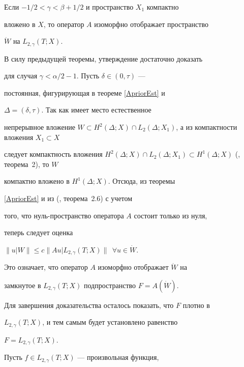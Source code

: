 \begin{thms}\label{GlobSolvComp}


Если $-1/2 < \gamma < \beta+1/2$ и пространство $X_1$ компактно


вложено в $X$, то оператор $A$ изоморфно отображает пространство


$\dot{W}$ на $L_{2,\gamma}(T;X)$.


\end{thms}








\begin{pf}


В силу предыдущей теоремы, утверждение достаточно доказать


для случая $\gamma < \alpha/2-1$. Пусть $\delta \in (0, \tau)$ ---


постоянная, фигурирующая в теореме \ref{ApriorEst} и


$\Delta=(\delta,\tau)$. Так как имеет место естественное


непрерывное вложение $W \subset H^2(\Delta;X) \cap


L_2(\Delta;X_1)$, а из компактности вложения $X_1 \subset X$


следует компактность вложения $H^2(\Delta;X) \cap L_2(\Delta;X_1)


\subset H^1(\Delta;X)$ (\cite{Shahmurov}, теорема~2), то $W$


компактно вложено в $H^1(\Delta;X)$. Отсюда, из теоремы


\ref{ApriorEst} и из (\cite{IzVuz03-3}, теорема~2.6) с учетом


того, что нуль-пространство оператора $A$ состоит только из нуля,


теперь следует оценка


$\|u|W\| \le c \|Au|L_{2,\gamma}(T;X)\| \ \ \forall u \in \Dot{W}$.


Это означает, что оператор $A$ изоморфно отображает $\Dot{W}$ на


замкнутое в $L_{2,\gamma}(T;X)$ подпространство $F=A(\Dot{W})$.


Для завершения доказательства осталось показать, что $F$ плотно в


$L_{2,\gamma}(T;X)$, и тем самым будет установлено равенство


$F=L_{2,\gamma}(T;X)$.





Пусть $f \in L_{2,\gamma}(T;X)$ --- произвольная функция,



\end{pf}

